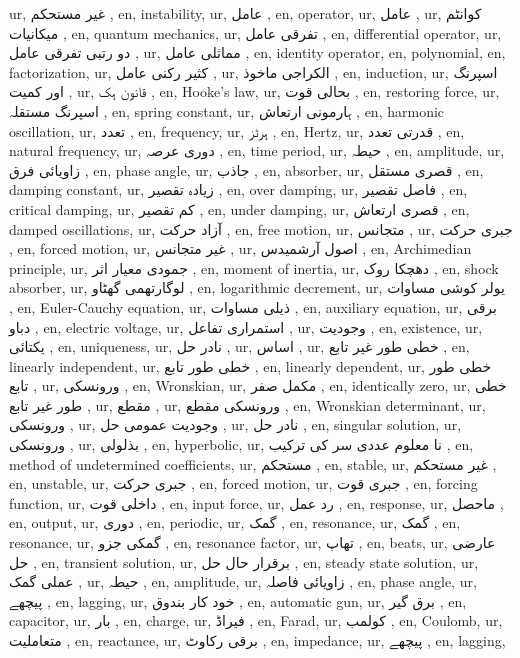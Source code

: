 ur, غیر مستحکم ,
en, instability,
ur, عامل ,
en, operator,
ur, عامل ,
ur, کوانٹم میکانیات ,
en, quantum mechanics,
ur, تفرقی عامل ,
en, differential operator,
ur, دو رتبی تفرقی عامل ,
ur, مماثلی عامل ,
en, identity operator,
en, polynomial,
en, factorization,
ur, کثیر رکنی عامل ,
ur, الکراجی ماخوذ ,
en, induction,
ur, اسپرنگ اور کمیت ,
ur, قانون ہک ,
en, Hooke's law,
ur, بحالی قوت ,
en, restoring force,
ur, اسپرنگ مستقلہ ,
en, spring constant,
ur, ہارمونی ارتعاش ,
en, harmonic oscillation,
ur, تعدد ,
en, frequency,
ur, ہرٹز ,
en, Hertz,
ur, قدرتی تعدد ,
en, natural frequency,
ur, دوری عرصہ ,
en, time period,
ur, حیطہ ,
en, amplitude,
ur, زاویائی فرق ,
en, phase angle,
ur, جاذب ,
en, absorber,
ur, قصری مستقل ,
en, damping constant,
ur, زیادہ تقصیر ,
en, over damping,
ur, فاصل تقصیر ,
en, critical damping,
ur, کم تقصیر ,
en, under damping,
ur, قصری ارتعاش ,
en, damped oscillations,
ur, آزاد حرکت ,
en, free motion,
ur, متجانس ,
ur, جبری حرکت ,
en, forced motion,
ur, غیر متجانس ,
ur, اصول آرشمیدس ,
en, Archimedian principle,
ur, جمودی معیار اثر ,
en, moment of inertia,
ur, دھچکا روک ,
en, shock absorber,
ur, لوگارتھمی گھٹاو ,
en, logarithmic decrement,
ur, یولر کوشی مساوات ,
en, Euler-Cauchy equation,
ur, ذیلی مساوات ,
en, auxiliary equation,
ur, برقی دباو ,
en, electric voltage,
ur, استمراری تفاعل ,
ur, وجودیت ,
en, existence,
ur, یکتائی ,
en, uniqueness,
ur, نادر حل ,
ur, اساس ,
ur, خطی طور غیر تابع ,
en, linearly independent,
ur, خطی طور تابع ,
en, linearly dependent,
ur, خطی طور تابع ,
ur, ورونسکی ,
en, Wronskian,
ur, مکمل صفر ,
en, identically zero,
ur, خطی طور غیر تابع ,
ur, مقطع ,
ur, ورونسکی مقطع ,
en, Wronskian determinant,
ur, ورونسکی ,
ur, وجودیت عمومی حل ,
ur, نادر حل ,
en, singular solution,
ur, ورونسکی ,
ur, بذلولی ,
en, hyperbolic,
ur, نا معلوم عددی سر کی ترکیب ,
en, method of undetermined coefficients,
ur, مستحکم ,
en, stable,
ur, غیر مستحکم ,
en, unstable,
ur, جبری حرکت ,
en, forced motion,
ur, جبری قوت ,
en, forcing function,
ur, داخلی قوت ,
en, input force,
ur, رد عمل ,
en, response,
ur, ماحصل ,
en, output,
ur, دوری ,
en, periodic,
ur, گمک ,
en, resonance,
ur, گمک ,
en, resonance,
ur, گمکی جزو ,
en, resonance factor,
ur, تھاپ ,
en, beats,
ur, عارضی حل ,
en, transient solution,
ur, برقرار حال حل ,
en, steady state solution,
ur, عملی گمک ,
ur, حیطہ ,
en, amplitude,
ur, زاویائی فاصلہ ,
en, phase angle,
ur, پیچھے ,
en, lagging,
ur, خود کار بندوق ,
en, automatic gun,
ur, برق گیر ,
en, capacitor,
ur, بار ,
en, charge,
ur, فیراڈ ,
en, Farad,
ur, کولمب ,
en, Coulomb,
ur, متعاملیت ,
en, reactance,
ur, برقی رکاوٹ ,
en, impedance,
ur, پیچھے ,
en, lagging,
